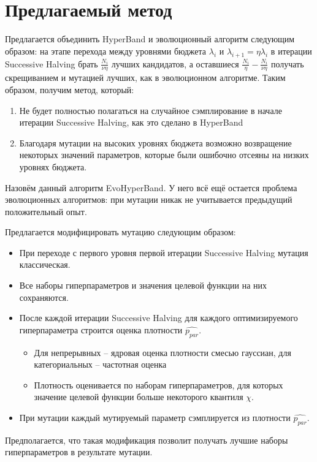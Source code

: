 \documentclass[a4paper,12pt]{article}
\begin{document}
\section{Предлагаемый метод}
Предлагается объединить HyperBand и эволюционный алгоритм следующим образом: на этапе перехода между уровнями бюджета $\lambda_i$ и $\lambda_{i+1} = \eta\lambda_i$ в итерации Successive Halving брать $\frac{N_i}{\nu\eta}$ лучших кандидатов, а оставшиеся $\frac{N_i}{\eta} - \frac{N_i}{\nu\eta}$ получать скрещиванием и мутацией лучших, как в эволюционном алгоритме. Таким образом, получим метод, который:
\begin{enumerate}
    \item Не будет полностью полагаться на случайное сэмплирование в начале итерации Successive Halving, как это сделано в HyperBand
    \item Благодаря мутации на высоких уровнях бюджета возможно возвращение некоторых значений параметров, которые были ошибочно отсеяны на низких уровнях бюджета.
\end{enumerate}

Назовём данный алгоритм EvoHyperBand. У него всё ещё остается проблема эволюционных алгоритмов: при мутации никак не учитывается предыдущий положительный опыт. 

Предлагается модифицировать мутацию следующим образом:
\begin{itemize}
    \item При переходе с первого уровня первой итерации Successive Halving мутация классическая.
    \item Все наборы гиперпараметров и значения целевой функции на них сохраняются.
    \item После каждой итерации Successive Halving для каждого оптимизируемого гиперпараметра строится оценка плотности $\hat{p_{par}}$.
    \begin{itemize}
        \item Для непрерывных -- ядровая оценка плотности смесью гауссиан, для категориальных -- частотная оценка
        \item Плотность оценивается по наборам гиперпараметров, для которых значение целевой функции больше некоторого квантиля $\chi$.
    \end{itemize}
    \item При мутации каждый мутируемый параметр сэмплируется из плотности $\hat{p_{par}}$.
\end{itemize}

Предполагается, что такая модификация позволит получать лучшие наборы гиперпараметров в результате мутации.
\end{document}
